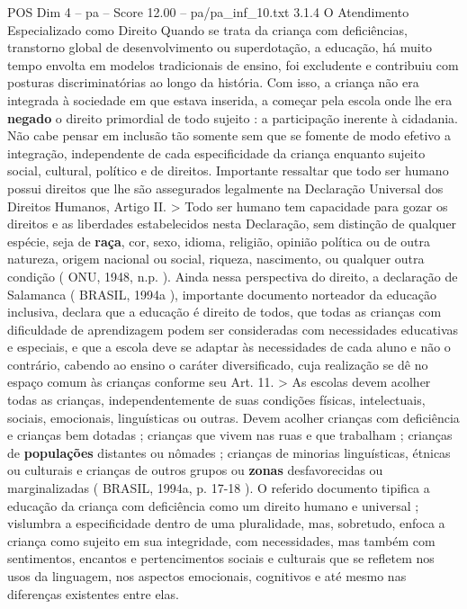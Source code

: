 \begin{textsample}{POS Dim 4 – pa – Score 12.00 – pa/pa\_inf\_10.txt}  \label{ex:f4_pos_016}
3.1.4 O Atendimento Especializado como Direito Quando se trata da criança com deficiências, transtorno global de desenvolvimento ou superdotação, a educação, há muito tempo envolta em modelos tradicionais de ensino, foi excludente e contribuiu com posturas discriminatórias ao longo da história.
Com isso, a criança não era integrada à sociedade em que estava inserida, a começar pela escola onde lhe era \textbf{negado} o direito primordial de todo sujeito : a participação inerente à cidadania.
Não cabe pensar em inclusão tão somente sem que se fomente de modo efetivo a integração, independente de cada especificidade da criança enquanto sujeito social, cultural, político e de direitos.
Importante ressaltar que todo ser humano possui direitos que lhe são assegurados legalmente na Declaração Universal dos Direitos Humanos, Artigo II. > Todo ser humano tem capacidade para gozar os direitos e as liberdades estabelecidos nesta Declaração, sem distinção de qualquer espécie, seja de \textbf{raça}, cor, sexo, idioma, religião, opinião política ou de outra natureza, origem nacional ou social, riqueza, nascimento, ou qualquer outra condição ( ONU, 1948, n.p. ).
Ainda nessa perspectiva do direito, a declaração de Salamanca ( BRASIL, 1994a ), importante documento norteador da educação inclusiva, declara que a educação é direito de todos, que todas as crianças com dificuldade de aprendizagem podem ser consideradas com necessidades educativas e especiais, e que a escola deve se adaptar às necessidades de cada aluno e não o contrário, cabendo ao ensino o caráter diversificado, cuja realização se dê no espaço comum às crianças conforme seu Art. 11. > As escolas devem acolher todas as crianças, independentemente de suas condições físicas, intelectuais, sociais, emocionais, linguísticas ou outras.
Devem acolher crianças com deficiência e crianças bem dotadas ; crianças que vivem nas ruas e que trabalham ; crianças de \textbf{populações} distantes ou nômades ; crianças de minorias linguísticas, étnicas ou culturais e crianças de outros grupos ou \textbf{zonas} desfavorecidas ou marginalizadas ( BRASIL, 1994a, p. 17-18 ).
O referido documento tipifica a educação da criança com deficiência como um direito humano e universal ; vislumbra a especificidade dentro de uma pluralidade, mas, sobretudo, enfoca a criança como sujeito em sua integridade, com necessidades, mas também com sentimentos, encantos e pertencimentos sociais e culturais que se refletem nos usos da linguagem, nos aspectos emocionais, cognitivos e até mesmo nas diferenças existentes entre elas.

\end{textsample}
